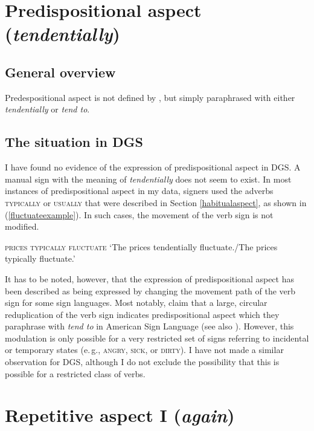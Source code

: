 
\section{Predispositional aspect (\textit{tendentially})}
\subsection{General overview}
Predespositional aspect is not defined by \citet{cinque1999adverbs, cinque2006restructuring}, but simply paraphrased with either \textit{tendentially} or \textit{tend to}. 

\subsection{The situation in DGS}
I have found no evidence of the expression of predispositional aspect in DGS. A manual sign with the meaning of \textit{tendentially} does not seem to exist. In most instances of predispositional aspect in my data, signers used the adverbs \textsc{typically} or \textsc{usually} that were described in Section \ref{habitualaspect}, as shown in (\ref{fluctuateexample}). In such cases, the movement of the verb sign is not modified. 

\begin{exe}
\ex \textsc{prices typically fluctuate}
\glt `The prices tendentially fluctuate./The prices typically fluctuate.' \label{fluctuateexample}
\end{exe}

\noindent It has to be noted, however, that the expression of predispositional aspect has been described as being expressed by changing the movement path of the verb sign for some sign languages. Most notably, \citet[249]{klima1979signs} claim that a large, circular reduplication of the verb sign indicates predispositional aspect which they paraphrase with \textit{tend to} in American Sign Language (see also \citealt{rathmann2005event}). However, this modulation is only possible for a very restricted set of signs referring to incidental or temporary states (e.\,g., \textsc{angry}, \textsc{sick}, or \textsc{dirty}). I have not made a similar observation for DGS, although I do not exclude the possibility that this is possible for a restricted class of verbs.  

\section{Repetitive aspect I (\textit{again})}\label{repetitiveonesection}
